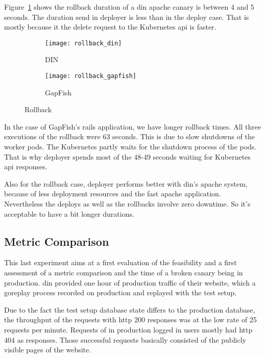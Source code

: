 Figure~\ref{fig:rollback_din} shows the rollback duration of a \gls{din} apache canary
is between 4 and 5 seconds. The duration send in deployer is less than in the deploy case.
That is mostly because it the delete request to the Kubernetes api is faster.

\begin{figure}[htbp]
  \centering
  \begin{subfigure}{.5\textwidth}
    \texttt{[image: rollback\_din]}
    \caption[DIN]{DIN}
    \label{fig:rollback_din}
  \end{subfigure}%
  \begin{subfigure}{.5\textwidth}
    \texttt{[image: rollback\_gapfish]}
    \caption[GapFish]{GapFish}
    \label{fig:rollback_gapfish}
  \end{subfigure}
  \caption[Deploy]{Rollback}
\end{figure}

In the case of GapFish's rails application, we have longer rollback times. All three
executions of the rollback were 63 seconds. This is due to slow shutdowns of the worker
pods. The Kubernetes partly waits for the shutdown process of the pods. That is why
deployer spends most of the 48-49 seconds waiting for Kubernetes api responses.

Also for the rollback case, deployer performs better with \gls{din}'s apache system, because of
less deployment resources and the fast apache application. Nevertheless the deploys as
well as the rollbacks involve zero downtime. So it's acceptable to have a bit longer
durations.

\subsection{Metric Comparison}
\label{sec:eval_metrics}

This last experiment aims at a first evaluation of the feasibility and a first assessment
of a metric comparison and the time of a broken canary being in production. \gls{din}
provided one hour of production traffic of their website, which a goreplay process
recorded on production and replayed with the test setup.

Due to the fact the test setup database state differs to the production database, the
throughput of the requests with http 200 responses was at the low rate of 25 requests per
minute. Requests of in production logged in users mostly had http 404 as responses. Those
successful requests basically consisted of the publicly visible pages of the website.

